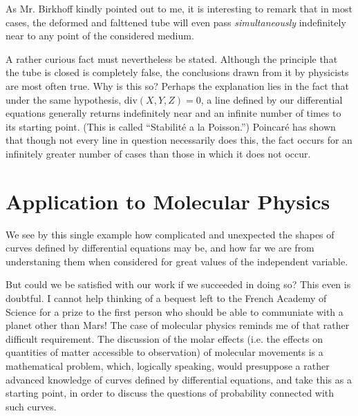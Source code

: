 \documentclass[12pt,oneside]{book}
\newcommand{\iit}[1]{\textit{#1}}
\begin{document}
As Mr. Birkhoff kindly pointed out to me, it is interesting to remark that in most cases, the deformed and falttened tube will even pass \iit{simultaneously} indefinitely near to any point of the considered medium. \par

A rather curious fact must nevertheless be stated. Although the principle that the tube is closed is completely false, the conclusions drawn from it by physicists are most often true. Why is this so? Perhaps the explanation lies in the fact that under the same hypothesis, div$(X,Y,Z)=0$, a line defined by our differential equations generally returns indefinitely near and an infinite number of times to its starting point. (This is called ``Stabilit\'e a la Poisson.'') Poincar\'e has shown that though not every line in question necessarily does this, the fact occurs for an infinitely greater number of cases than those in which it does not occur. \par

\section{Application to Molecular Physics}
We see by this single example how complicated and unexpected the shapes of curves defined by differential equations may be, and how far we are from understaning them when considered for great values of the independent variable. \par

But could we be satisfied with our work if we succeeded in doing so? This even is doubtful. I cannot help thinking of a bequest left to the French Academy of Science for a prize to the first person who should be able to communiate with a planet other than Mars! The case of molecular physics reminds me of that rather difficult requirement. The discussion of the molar effects (i.e. the effects on quantities of matter accessible to observation) of molecular movements is a mathematical problem, which, logically speaking, would presuppose a rather advanced knowledge of curves defined by differential equations, and take this as a starting point, in order to discuss the questions of probability connected with such curves. \par
\end{document}
